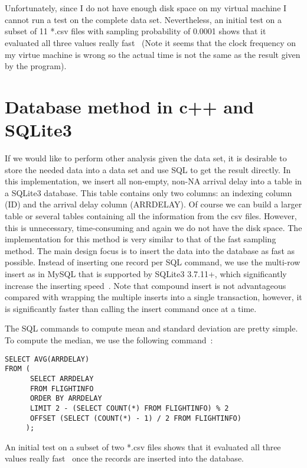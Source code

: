 \documentclass{article}
\begin{document}
\\\\
Unfortunately, since I do not have enough disk space on my virtual machine I cannot run a test on the complete data set. Nevertheless, an initial test on a subset of 11 *.csv files with sampling probability of 0.0001 shows that it evaluated all three values really fast~\cite{FastSample} (Note it seems that the clock frequency on my virtue machine is wrong so the actual time is not the same as the result given by the program).

\section{Database method in c++ and SQLite3}
\lstset{language=SQL,breaklines=true}
If we would like to perform other analysis given the data set, it is desirable to store the needed data into a data set and use SQL to get the result directly. In this implementation, we insert all non-empty, non-NA arrival delay into a table in a SQLite3 database. This table contains only two columns: an indexing column (ID) and the arrival delay column (ARRDELAY). Of course we can build a larger table or several tables containing all the information from the csv files. However, this is unnecessary, time-consuming and again we do not have the disk space. The implementation for this method is very similar to that of the fast sampling method. The main design focus is to insert the data into the database as fast as possible. Instead of inserting one record per SQL command, we use the multi-row insert as in MySQL that is supported by SQLite3 3.7.11+, which significantly increase the inserting speed~\cite{MultipleRow}. Note that compound insert is not advantageous compared with wrapping the multiple inserts into a single transaction, however, it is significantly faster than calling the insert command once at a time.

The SQL commands to compute mean and standard deviation are pretty simple. To compute the median, we use the following command~\cite{Median}:
\begin{lstlisting}
SELECT AVG(ARRDELAY)
FROM (
      SELECT ARRDELAY
      FROM FLIGHTINFO
      ORDER BY ARRDELAY
      LIMIT 2 - (SELECT COUNT(*) FROM FLIGHTINFO) % 2
	  OFFSET (SELECT (COUNT(*) - 1) / 2 FROM FLIGHTINFO)
     );
\end{lstlisting}
An initial test on a subset of two *.csv files shows that it evaluated all three values really fast~\cite{FastSample} once the records are inserted into the database.





\end{document}
